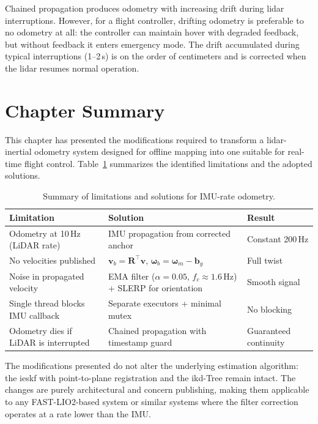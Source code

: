 Chained propagation produces odometry with increasing drift during \gls{lidar}
interruptions. However, for a flight controller, drifting odometry is preferable to
no odometry at all: the controller can maintain hover with degraded feedback, but
without feedback it enters emergency mode. The drift accumulated during typical
interruptions (1--2\,s) is on the order of centimeters and is corrected when the
\gls{lidar} resumes normal operation.

\section{Chapter Summary}
\label{sec:fr-summary}

This chapter has presented the modifications required to transform a \gls{lidar}-%
inertial odometry system designed for offline mapping into one suitable for
real-time flight control. Table~\ref{tab:fr-summary} summarizes the identified
limitations and the adopted solutions.

\begin{table}[ht]
\centering
\caption{Summary of limitations and solutions for IMU-rate odometry.}
\label{tab:fr-summary}
\begin{tabular}{p{4.5cm} p{4.5cm} p{3.5cm}}
\toprule
\textbf{Limitation} & \textbf{Solution} & \textbf{Result} \\
\midrule
Odometry at 10\,Hz (LiDAR rate) &
IMU propagation from corrected anchor &
Constant 200\,Hz \\
\addlinespace
No velocities published &
$\mathbf{v}_b = \mathbf{R}^\top \mathbf{v}$,
$\boldsymbol{\omega}_b = \boldsymbol{\omega}_m - \mathbf{b}_g$ &
Full twist \\
\addlinespace
Noise in propagated velocity &
EMA filter ($\alpha = 0.05$, $f_c \approx 1.6$\,Hz) +
SLERP for orientation &
Smooth signal \\
\addlinespace
Single thread blocks IMU callback &
Separate executors + minimal mutex &
No blocking \\
\addlinespace
Odometry dies if LiDAR is interrupted &
Chained propagation with timestamp guard &
Guaranteed continuity \\
\bottomrule
\end{tabular}
\end{table}

The modifications presented do not alter the underlying estimation algorithm: the
\gls{ieskf} with point-to-plane registration and the ikd-Tree remain intact. The
changes are purely architectural and concern publishing, making them applicable to
any FAST-LIO2-based system or similar systems where the filter correction operates
at a rate lower than the IMU.
